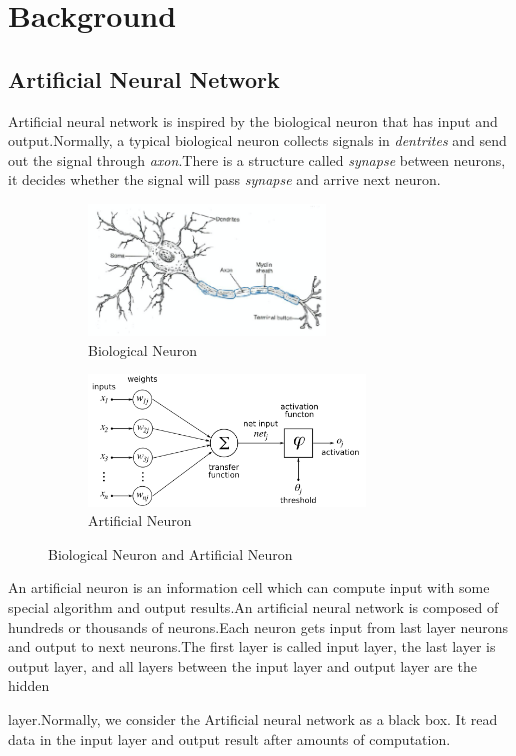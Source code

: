 \documentclass[12pt,a4paper]{report}
\begin{document}
\section{Background}
\subsection{Artificial Neural Network}
Artificial neural network is inspired by the biological neuron that has input and output.Normally, a typical biological neuron collects  signals in \textit{dentrites} and send out the signal through \textit{axon}.There is a structure called \textit{synapse} between neurons, it decides whether the signal will pass \textit{synapse} and arrive next neuron.
\begin{figure}[h]
\begin{subfigure}{0.5\linewidth}
	\includegraphics[height=3.5cm,width=\textwidth]{n1.png}
	\caption{Biological Neuron}
\end{subfigure}
\begin{subfigure}{0.5\linewidth}
	\includegraphics[height=3.5cm,width=\textwidth]{Aneuron.png}
	\caption{Artificial Neuron}
\end{subfigure}
\label{Biological Neuron and Artificial Neuron}
\caption{Biological Neuron and Artificial Neuron}
\end{figure}
An artificial neuron is an information cell which can compute input with some special algorithm and output results.An artificial neural network is composed of hundreds or thousands of neurons.Each neuron gets input from last layer neurons and output to next neurons.The first layer is called input layer, the last layer is output layer, and all layers between the input layer and output layer are the hidden\cite{cnn}

 layer.Normally, we consider the Artificial neural network as a black box. It read data in the input layer and output result after amounts of computation.\\ 
\end{document}
